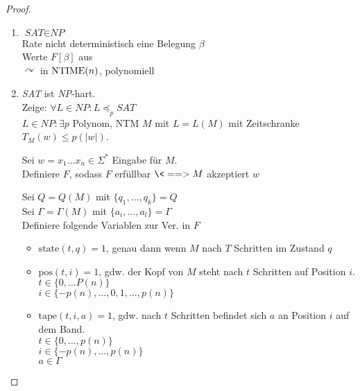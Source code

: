 \begin{proof}\
	\begin{enumerate}
	\item $\textit{SAT}\in \textit{NP}$\\
		Rate nicht deterministisch eine Belegung $\beta$\\
		Werte $F[\beta]$ aus\\
		$\curvearrowright$ in $\operatorname{NTIME}(n)$, polynomiell
	\item \textit{SAT} ist \textit{NP}-hart.\\
		Zeige: $\forall L\in \textit{NP}: L \preceq_p \textit{SAT}$\\
		$L\in \textit{NP}: \exists p$ Polynom, \ac{NTM} $M$ mit $L=L(M)$ mit Zeitschranke $T_M(w)\leq p(|w|)$.
		
		Sei $w = x_1\dots x_n\in\Sigma^*$ Eingabe für $M$.\\
		Definiere $F$, sodass $F$ erfüllbar $\<==> M$ akzeptiert $w$
		
		Sei $Q=Q(M)$ mit $\{q_1,\dots,q_k\}=Q$\\
		Sei $\Gamma = \Gamma(M)$ mit $\{a_i,\dots,a_l\} = \Gamma$\\
		Definiere folgende Variablen zur Ver. in $F$
		\begin{itemize}
		\item $\mathrm{state}(t,q) = 1$, genau dann wenn $M$ nach $T$ Schritten im Zustand $q$
		\item $\mathrm{pos}(t,i) = 1$, gdw. der Kopf von $M$ steht nach $t$ Schritten auf Position $i$.\\
		$t\in\{0,\dots P(n)\}$\\
		$i\in \{-p(n),\dots,0,1,\dots,p(n)\}$
		\item $\mathrm{tape}(t,i,a) = 1$, gdw. nach $t$ Schritten befindet sich $a$ an Position $i$ auf dem Band.\\
		$t\in\{0,\dots,p(n)\}$\\
		$i\in\{-p(n),\dots,p(n)\}$\\
		$a\in\Gamma$ \qedhere
		\end{itemize}
	\end{enumerate}
\end{proof}

